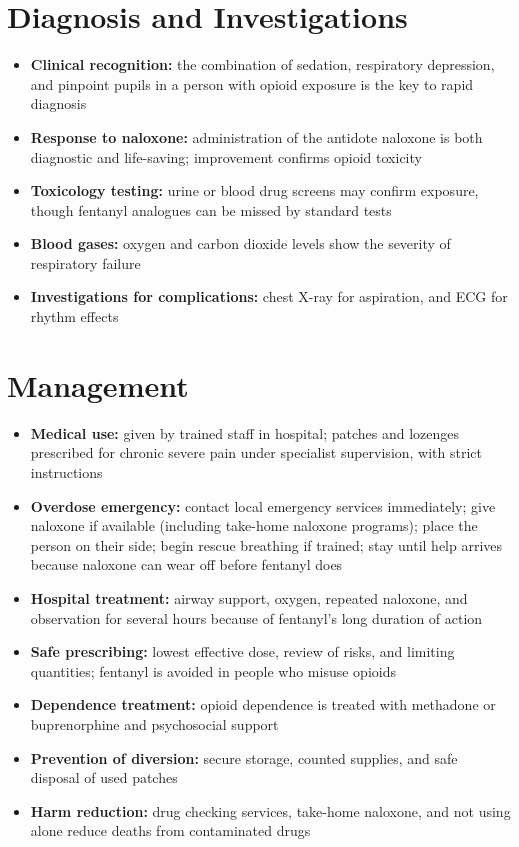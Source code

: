 \section*{Diagnosis and Investigations}
\begin{itemize}
    \item \textbf{Clinical recognition:} the combination of sedation, respiratory depression, and pinpoint pupils in a person with opioid exposure is the key to rapid diagnosis
    \item \textbf{Response to naloxone:} administration of the antidote naloxone is both diagnostic and life-saving; improvement confirms opioid toxicity
    \item \textbf{Toxicology testing:} urine or blood drug screens may confirm exposure, though fentanyl analogues can be missed by standard tests
    \item \textbf{Blood gases:} oxygen and carbon dioxide levels show the severity of respiratory failure
    \item \textbf{Investigations for complications:} chest X-ray for aspiration, and ECG for rhythm effects
\end{itemize}

\section*{Management}
\begin{itemize}
    \item \textbf{Medical use:} given by trained staff in hospital; patches and lozenges prescribed for chronic severe pain under specialist supervision, with strict instructions
    \item \textbf{Overdose emergency:} contact local emergency services immediately; give naloxone if available (including take-home naloxone programs); place the person on their side; begin rescue breathing if trained; stay until help arrives because naloxone can wear off before fentanyl does
    \item \textbf{Hospital treatment:} airway support, oxygen, repeated naloxone, and observation for several hours because of fentanyl's long duration of action
    \item \textbf{Safe prescribing:} lowest effective dose, review of risks, and limiting quantities; fentanyl is avoided in people who misuse opioids
    \item \textbf{Dependence treatment:} opioid dependence is treated with methadone or buprenorphine and psychosocial support
    \item \textbf{Prevention of diversion:} secure storage, counted supplies, and safe disposal of used patches
    \item \textbf{Harm reduction:} drug checking services, take-home naloxone, and not using alone reduce deaths from contaminated drugs
\end{itemize}

